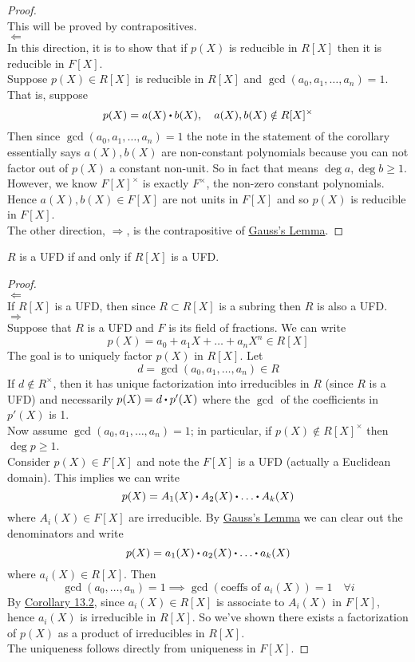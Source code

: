 \documentclass[../Main.tex]{subfiles}
\begin{document}
\begin{proof}~\\
	This will be proved by contrapositives.\\
	$\Longleftarrow$\\
	In this direction, it is to show that if $p(X)$ is reducible in $R[X]$ then it is reducible in $F[X]$.\\
	Suppose $p(X)\in R[X]$ is reducible in $R[X]$ and $\gcd(a_0,a_1,\dots,a_n)=1$. That is, suppose
	\[p(X)=a(X)\rdot b(X),\quad a(X), b(X) \notin R[X]^\times \]
	Then since
	$\gcd(a_0,a_1,\dots,a_n)=1$ the note in the statement of the corollary essentially says $a(X),b(X)$ are non-constant polynomials because you can not factor out of $p(X)$ a constant non-unit. So in fact that means $\deg a, \deg b\ge 1$.\\
	However, we know $F[X]^\times$ is exactly $F^\times$, the non-zero constant polynomials. Hence $a(X),b(X)\in F[X]$ are not units in $F[X]$ and so $p(X)$ is reducible in $F[X]$.\\
	The other direction, $\Longrightarrow$, is the contrapositive of \hyperref[lem:gauss]{Gauss's Lemma}.
\end{proof}
\begin{thm}[title = \texorpdfstring{$R$ UFD $\Longleftrightarrow R[X]$ UFD}{R UFD iff R[X] UFD}]
	$R$ is a UFD if and only if $R[X]$ is a UFD.
\end{thm}
\begin{proof}~\\
	$\Leftarrow$\\
	If $R[X]$ is a UFD, then since $R\subset R[X]$ is a subring then $R$ is also a UFD.\\
	$\Rightarrow$\\
	Suppose that $R$ is a UFD and $F$ is its field of fractions. We can write
	\[p(X) =a_0+a_1X+\dots+a_nX^n\in R[X]\]
	The goal is to uniquely factor $p(X)$ in $R[X]$. Let
	\[d=\gcd(a_0,a_1,\dots,a_n)\in R\]
	If $d\notin R^\times$, then it has unique factorization into irreducibles in $R$ (since $R$ is a UFD) and necessarily $p(X) = d\rdot p'(X)$ where the $\gcd$ of the coefficients in $p'(X)$ is 1. \\
	Now assume $\gcd(a_0,a_1,\dots,a_n)=1$; in particular, if $p(X)\notin R[X]^\times$ then $\deg p\ge 1$.\\
	Consider $p(X)\in F[X]$ and note the $F[X]$ is a UFD (actually a Euclidean domain). This implies we can write
	\[p(X)=A_1(X)\rdot A_2(X)\rdot \dots \rdot A_k(X)\]
	where $A_i(X)\in F[X]$ are irreducible. By \hyperref[lem:gauss]{Gauss's Lemma} we can clear out the denominators and write
	\[p(X)=a_1(X)\rdot a_2(X)\rdot \dots \rdot a_k(X)\]
	where $a_i(X)\in R[X]$. Then
	\[\gcd(a_0,\dots,a_n)=1 \implies \gcd(\text{coeffs of }a_i(X))=1\quad \forall i\]
	By \hyperref[co:13.2]{Corollary 13.2}, since $a_i(X)\in R[X]$ is associate to $A_i(X)$ in $F[X]$, hence $a_i(X)$ is irreducible in $R[X]$. So we've shown there exists a factorization of $p(X)$ as a product of irreducibles in $R[X]$.\\
	The uniqueness follows directly from uniqueness in $F[X]$.
\end{proof}
\end{document}
